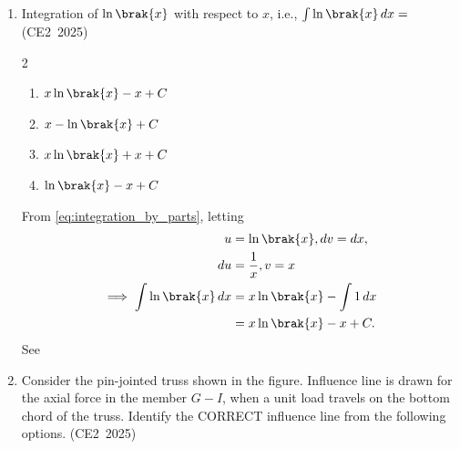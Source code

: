 \begin{enumerate}[label=\thesubsection.\arabic*, ref=\thesubsection.\theenumi,itemsep=0pt]
\begin{multicols}{4}\begin{enumerate}
    \item $\myvec{2&1&4\\3&4&3\\4&5&2}$
    \item $\myvec{4&3&2\\5&4&1\\2&3&4}$
    \item $\myvec{4&2&3\\5&1&4\\2&4&3}$
    \item $\myvec{2&3&4\\1&4&5\\4&3&2}$
\end{enumerate}\end{multicols}
%
\solution
Using the following code,
\begin{align}
    \vec{A}^{\top}
    = \myvec{
        2 & 1 & 4 \\
        3 & 4 & 3 \\
        4 & 5 & 2
    }.
\end{align}
%
\item
Integration of $\ln\brak{x}$ with respect to $x$, i.e.,
$\int\ln\brak{x}\,dx=$\underline{\hspace{3cm}}
\hfill (CE2~2025)

\begin{multicols}{2}\begin{enumerate}
    \item $x\ln\brak{x}-x+C$
    \item $x-\ln\brak{x}+C$
    \item $x\ln\brak{x}+x+C$
    \item $\ln\brak{x}-x+C$
\end{enumerate}\end{multicols}
%
\solution
From \eqref{eq:integration_by_parts},
letting
\begin{align}
	u&=\ln\brak{x}, dv=dx,
\\
	du &= \frac{1}{x}, v = x
\\
\implies
    \int\ln\brak{x}\,dx
    &=x\ln\brak{x} -\int1\,dx \\
    &=x\ln\brak{x}-x+C.
\end{align}
\iffalse
See
%
\item
Consider the pin-jointed truss shown in the figure. Influence line is drawn for
the axial force in the member $G-I$, when a unit load travels on the bottom
chord of the truss. Identify the CORRECT influence line from the following
options.
\hfill (CE2~2025)


\end{enumerate}
